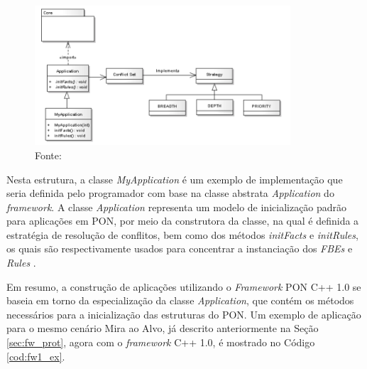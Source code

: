 \begin{figure}[!htb]
  \centering
  \includegraphics[width=0.85\textwidth]{../figures/fw1_structure.png}
  \caption{Estrutura do \textit{framework} C++ 1.0} \caption*{Fonte:
    }
  \label{fig:fw_pkg}
\end{figure}

Nesta estrutura, a classe \textit{MyApplication} é um exemplo de implementação
que seria definida pelo programador com base na classe abstrata
\textit{Application} do \textit{framework}. A classe \textit{Application}
representa um modelo de inicialização padrão para aplicações em PON, por meio da
construtora da classe, na qual é definida a estratégia de resolução de
conflitos, bem como dos métodos \textit{initFacts} e \textit{initRules}, os
quais são respectivamente usados para concentrar a instanciação dos
\textit{FBEs} e \textit{Rules} \cite{msc_Banaszewski_2009}.

Em resumo, a construção de aplicações utilizando o \textit{Framework} PON C++
1.0 se baseia em torno da especialização da classe \textit{Application}, que
contém os métodos necessários para a inicialização das estruturas do PON. Um
exemplo de aplicação para o mesmo cenário Mira ao Alvo, já descrito
anteriormente na Seção \ref{sec:fw_prot}, agora com o \textit{framework} C++
1.0, é mostrado no Código \ref{cod:fw1_ex}.

